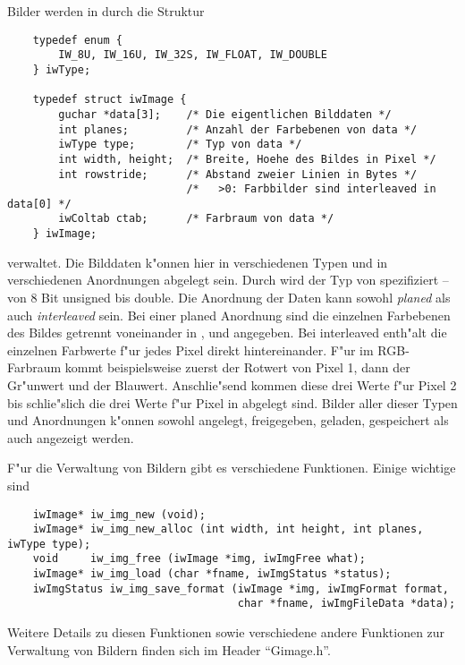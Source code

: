 Bilder werden in \icewing{} durch die Struktur
\begin{small}
\linespread{0.9}
\begin{verbatim}
    typedef enum {
        IW_8U, IW_16U, IW_32S, IW_FLOAT, IW_DOUBLE
    } iwType;

    typedef struct iwImage {
        guchar *data[3];    /* Die eigentlichen Bilddaten */
        int planes;         /* Anzahl der Farbebenen von data */
        iwType type;        /* Typ von data */
        int width, height;  /* Breite, Hoehe des Bildes in Pixel */
        int rowstride;      /* Abstand zweier Linien in Bytes */
                            /*   >0: Farbbilder sind interleaved in data[0] */
        iwColtab ctab;      /* Farbraum von data */
    } iwImage;
\end{verbatim}
\end{small}
verwaltet. Die Bilddaten k"onnen hier in verschiedenen Typen und in
verschiedenen Anordnungen abgelegt sein. Durch  wird
der Typ von  spezifiziert -- von 8 Bit unsigned bis
double. Die Anordnung der Daten kann sowohl \emph{planed} als auch
\emph{interleaved} sein. Bei einer planed Anordnung sind die
einzelnen Farbebenen des Bildes getrennt voneinander in
,  und  angegeben. Bei
interleaved enth"alt  die einzelnen Farbwerte f"ur
jedes Pixel direkt hintereinander. F"ur  im
RGB-Farbraum kommt beispielsweise zuerst der Rotwert von Pixel 1,
dann der Gr"unwert und der Blauwert. Anschlie"send kommen diese drei
Werte f"ur Pixel 2 bis schlie"slich die drei Werte f"ur Pixel
 in  abgelegt sind. Bilder aller
dieser Typen und Anordnungen k"onnen sowohl angelegt, freigegeben,
geladen, gespeichert als auch angezeigt werden.

F"ur die Verwaltung von Bildern gibt es verschiedene
Funktionen. Einige wichtige sind
\begin{small}
\linespread{0.9}
\begin{verbatim}
    iwImage* iw_img_new (void);
    iwImage* iw_img_new_alloc (int width, int height, int planes, iwType type);
    void     iw_img_free (iwImage *img, iwImgFree what);
    iwImage* iw_img_load (char *fname, iwImgStatus *status);
    iwImgStatus iw_img_save_format (iwImage *img, iwImgFormat format,
                                    char *fname, iwImgFileData *data);
\end{verbatim}
\end{small}
Weitere Details zu diesen Funktionen sowie verschiedene andere
Funktionen zur Verwaltung von Bildern finden sich im Header
``Gimage.h''.

